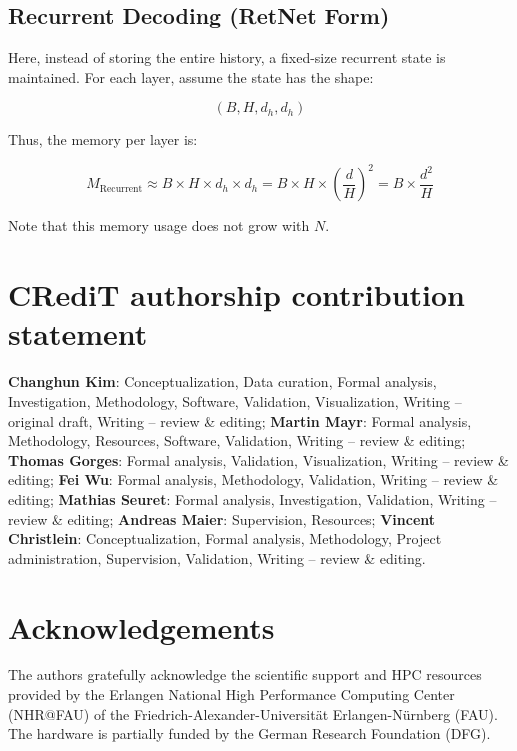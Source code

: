\documentclass[times, review, 10pt]{elsarticle}
\begin{document}
\subsection{Recurrent Decoding (RetNet Form)}

Here, instead of storing the entire history, a fixed-size recurrent state is maintained. For each layer, assume the state has the shape:

\begin{equation}
\label{eq:app-beam-recurrent-shape}
(B, H, d_h, d_h)
\end{equation}

Thus, the memory per layer is:

\begin{equation}
\label{eq:app-beam-recurrent-mem}
M_{\text{Recurrent}} \approx B \times H \times d_h \times d_h = B \times H \times \left(\frac{d}{H}\right)^2 = B \times \frac{d^2}{H}
\end{equation}

Note that this memory usage does not grow with \(N\).

\section*{CRediT authorship contribution statement}
\textbf{Changhun Kim}: Conceptualization, Data curation, Formal analysis, Investigation, Methodology, Software, Validation, Visualization, Writing -- original draft, Writing -- review \& editing; \textbf{Martin Mayr}: Formal analysis, Methodology, Resources, Software, Validation, Writing -- review \& editing; \textbf{Thomas Gorges}: Formal analysis, Validation, Visualization, Writing -- review \& editing; \textbf{Fei Wu}: Formal analysis, Methodology, Validation, Writing -- review \& editing; \textbf{Mathias Seuret}: Formal analysis, Investigation, Validation, Writing -- review \& editing; \textbf{Andreas Maier}: Supervision, Resources; \textbf{Vincent Christlein}: Conceptualization, Formal analysis, Methodology, Project administration, Supervision, Validation, Writing -- review \& editing.

\section*{Acknowledgements}
The authors gratefully acknowledge the scientific support and HPC resources provided by the Erlangen National High Performance Computing Center (NHR@FAU) of the Friedrich-Alexander-Universität Erlangen-Nürnberg (FAU). The hardware is partially funded by the German Research Foundation (DFG).
\end{document}

